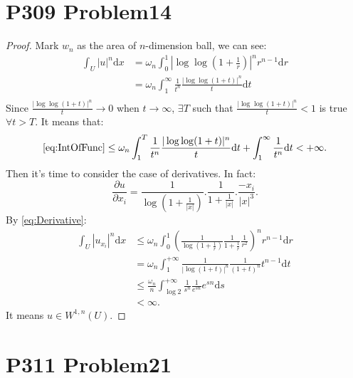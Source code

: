 \documentclass[a4paper]{ctexart}
\newcommand{\dif}{\mathrm{d}}
\newcommand{\pdfFrac}[2]{\frac{\partial #1}{\partial #2}}
\begin{document}
\section*{P309 Problem14}
\begin{proof}
Mark $w_{n}$ as the area of $n$-dimension ball, we can see:
\begin{equation}
    \label{eq:IntOfFunc}
    \begin{aligned}
        \int_{U}|u|^{n}\dif x&=\omega_{n}\int_{0}^{1}|\log\log(1+\frac{1}{r})|^{n}r^{n-1}\dif r\\
        &=\omega_{n}\int_{1}^{\infty}\frac{1}{t^{n}}\frac{|\log\log(1+t)|^{n}}{t}\dif t\\
    \end{aligned}
\end{equation}
Since $\frac{|\log\log(1+t)|^{n}}{t}\rightarrow 0$ when $t\rightarrow \infty$, $\exists T$ such that $\frac{|\log\log(1+t)|^{n}}{t}<1$ is true $\forall t>T$. It means that:
\begin{equation}
    \label{eq:approxInt}
    \eqref{eq:IntOfFunc}\le \omega_{n}\int_{1}^{T}\frac{1}{t^{n}}\frac{|\log\log(1+t)|^{n}}{t}\dif t+\int_{1}^{\infty}\frac{1}{t^{n}}\dif t<+\infty.
\end{equation}
Then it's time to consider the case of derivatives. In fact:
\begin{equation}
    \label{eq:Derivative}
    \pdfFrac{u}{x_{i}}=\frac{1}{\log(1+\frac{1}{|x|})}.\frac{1}{1+\frac{1}{|x|}}.\frac{-x_{i}}{|x|^{3}}.
\end{equation}
By \eqref{eq:Derivative}:
\begin{equation}
    \begin{aligned}
        \int_{U}|u_{x_{i}}|^{n}\dif x&\le\omega_{n}\int_{0}^{1}(\frac{1}{\log(1+\frac{1}{r})}\frac{1}{1+\frac{1}{r}}\frac{1}{r^{2}})^{n}r^{n-1}\dif r\\
        &=\omega_{n}\int_{1}^{+\infty}\frac{1}{|\log(1+t)|^{n}}\frac{1}{(1+t)^{n}}t^{n-1}\dif t\\
        &\le\frac{\omega_{n}}{n}\int_{\log 2}^{+\infty}\frac{1}{s^{n}}\frac{1}{e^{sn}}e^{sn}\dif s\\
        &<\infty.
    \end{aligned}
\end{equation}
It means $u\in W^{1,n}(U)$.
\end{proof}
\section*{P311 Problem21}
\end{document}
